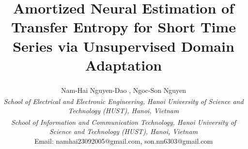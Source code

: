 \documentclass[lettersize,journal]{IEEEtran}
\newcommand{\orcid}[1]{\href{https://orcid.org/#1}{\textcolor[HTML]{A6CE39}{\aiOrcid}}}
\begin{document}
\title{Amortized Neural Estimation of Transfer Entropy for Short Time Series via Unsupervised Domain Adaptation}

\author{
Nam-Hai Nguyen-Dao\textsuperscript{ }\orcid{0009-0003-4140-3367}, 
Ngoc-Son Nguyen\textsuperscript{ }

\vspace{0.2cm}
\normalsize \textsuperscript{ }\textit{School of Electrical and Electronic Engineering, Hanoi University of Science and Technology (HUST), Hanoi, Vietnam} \\
\normalsize \textsuperscript{ }\textit{School of Information and Communication Technology, Hanoi University of Science and Technology (HUST), Hanoi, Vietnam} \\
\normalsize Email: namhai23092005@gmail.com, son.nn6303@gmail.com
}

\maketitle
\end{document}
